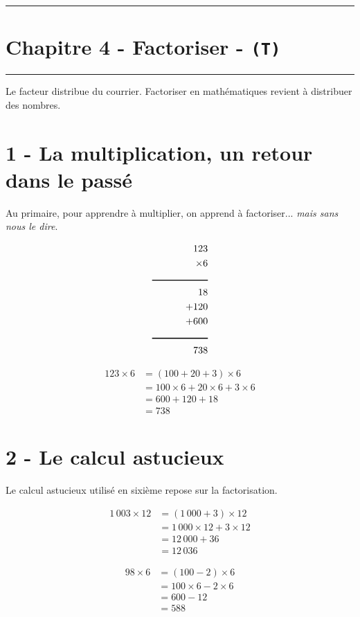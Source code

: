 \documentclass[11pt]{article}
\newcommand{\horrule}[1]{\rule{\linewidth}{#1}} %
\begin{document}
\setlength{\columnseprule}{1pt}

\horrule{2px}
\section*{Chapitre 4 - Factoriser - \texttt{(T)}}
\horrule{2px}

Le facteur distribue du courrier. Factoriser en mathématiques revient à distribuer des nombres.

\section*{1 - La multiplication, un retour dans le passé}

Au primaire, pour apprendre à multiplier, on apprend à factoriser... \textit{mais sans nous le dire}.

\begin{multicols}{2}
  \begin{align*}
       123 & \\
  \times 6 & \\
  \text{\rule{2cm}{1px}} & \\
        18 & \\
    +  120 & \\
    +  600 & \\
  \text{\rule{2cm}{1px}} & \\
      738
  \end{align*}

  \begin{align*}
  123 \times 6 &= (100 + 20 + 3) \times 6 \\
               &= 100 \times 6 + 20 \times 6 + 3 \times 6 \\
               &= 600 + 120 + 18\\
               &= 738
  \end{align*}
\end{multicols}

\section*{2 - Le calcul astucieux}

Le calcul astucieux utilisé en sixième repose sur la factorisation. 

\begin{multicols}{2}
  \begin{align*}
  1\,003 \times 12 &= (1\,000 + 3) \times 12 \\
                  &= 1\,000 \times 12 + 3 \times 12 \\
                  &= 12\, 000 + 36\\
                  &= 12\, 036
  \end{align*}

  \begin{align*}
  98 \times 6 &= (100 - 2) \times 6 \\
              &= 100 \times 6 - 2 \times 6 \\
              &= 600 - 12\\
              &= 588
  \end{align*} 
\end{multicols}
\end{document}
